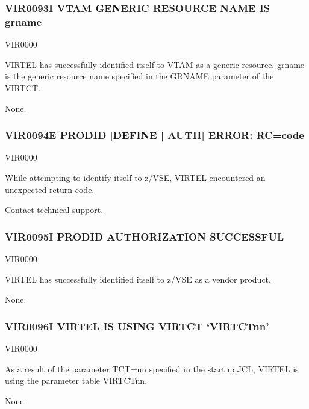 \documentclass[letterpaper,10pt,english]{sphinxmanual}
\begin{document}
\subsubsection{VIR0093I VTAM GENERIC RESOURCE NAME IS grname}
\label{\detokenize{messages:vir0093i-vtam-generic-resource-name-is-grname}}\begin{description}
\sphinxAtStartPar
VIR0000

\sphinxAtStartPar
VIRTEL has successfully identified itself to VTAM as a generic resource. grname is the generic resource name specified in the GRNAME parameter of the VIRTCT.

\sphinxAtStartPar
None.

\end{description}


\subsubsection{VIR0094E PRODID {[}DEFINE | AUTH{]} ERROR: RC=code}
\label{\detokenize{messages:vir0094e-prodid-define-auth-error-rc-code}}\begin{description}
\sphinxAtStartPar
VIR0000

\sphinxAtStartPar
While attempting to identify itself to z/VSE, VIRTEL encountered an unexpected return code.

\sphinxAtStartPar
Contact technical support.

\end{description}


\subsubsection{VIR0095I PRODID AUTHORIZATION SUCCESSFUL}
\label{\detokenize{messages:vir0095i-prodid-authorization-successful}}\begin{description}
\sphinxAtStartPar
VIR0000

\sphinxAtStartPar
VIRTEL has successfully identified itself to z/VSE as a vendor product.

\sphinxAtStartPar
None.

\end{description}


\subsubsection{VIR0096I VIRTEL IS USING VIRTCT ‘VIRTCTnn’}
\label{\detokenize{messages:vir0096i-virtel-is-using-virtct-virtctnn}}\begin{description}
\sphinxAtStartPar
VIR0000

\sphinxAtStartPar
As a result of the parameter TCT=nn specified in the startup JCL, VIRTEL is using the parameter table VIRTCTnn.

\sphinxAtStartPar
None.

\end{description}
\end{document}
